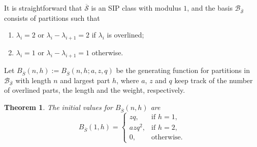 \documentclass[12pt]{amsart}
\newtheorem{theorem}{Theorem}[section]
\theoremstyle{definition}
\theoremstyle{remark}
\numberwithin{equation}{section}
\begin{document}
It is straightforward that $\overline{\mathcal{S}}$ is an SIP class with modulus $1$, and the basis $\mathcal{B}_{\overline{\mathcal{S}}}$ consists of partitions such that
\begin{enumerate}
    \item $\lambda_i=2$ or $\lambda_i-\lambda_{i+1}=2$ if $\lambda_i$ is overlined;
    \item $\lambda_i=1$ or $\lambda_i-\lambda_{i+1}=1$ otherwise.
\end{enumerate}
\par Let $B_{\overline{S}}(n,h):=B_{\overline{S}}(n,h;a,z,q)$ be the generating function for partitions in $\mathcal{B}_{\overline{\mathcal{S}}}$ with length $n$ and largest part $h$, where $a$, $z$ and $q$ keep track of the number of overlined parts, the length and the weight, respectively.
\begin{theorem}
The initial values for $B_{\overline{S}}(n,h)$ are
\begin{equation}
B_{\overline{S}}(1,h)=\begin{cases}
   zq,  & \text{if $h=1$,} \\
   azq^{2},  & \text{if $h=2$,}\\
   0, & \text{otherwise.}
\end{cases}
\end{equation}
\end{theorem}
\end{document}
